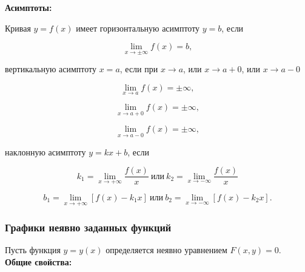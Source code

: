     \textbf{Асимптоты:}

    Кривая $y = f(x)$ имеет горизонтальную асимптоту $y = b$, если

    \[
        \lim_{x \rightarrow \pm \infty} f(x) = b,
    \]

	вертикальную асимптоту $x = a$, если при $x \rightarrow a$, или $x \rightarrow a + 0$, или $x \rightarrow a - 0$

	\[
		\lim_{x \rightarrow a} f(x) = \pm \infty,
	\]

	\[
		\lim_{x \rightarrow a + 0} f(x) = \pm \infty,
	\]

	\[
		\lim_{x \rightarrow a - 0} f(x) = \pm \infty,
	\]

	наклонную асимптоту $y = k x + b$, если

	\[
		k_{1} = \lim_{x \rightarrow + \infty} \frac{f(x)}{x} \: \mbox{или} \: k_{2} = \lim_{x \rightarrow - \infty} \frac{f(x)}{x}
	\]

	\[
		b_{1} = \lim_{x \rightarrow + \infty} \left[ f(x) - k_{1} x \right] \: \mbox{или} \: b_{2} = \lim_{x \rightarrow - \infty} \left[ f(x) - k_{2} x \right].
	\]

	\subsubsection{Графики неявно заданных функций}

Пусть функция $y = y \left( x \right)$ определяется неявно уравнением $F \left( x, y \right) = 0$.\\

\textbf{Общие свойства:}

